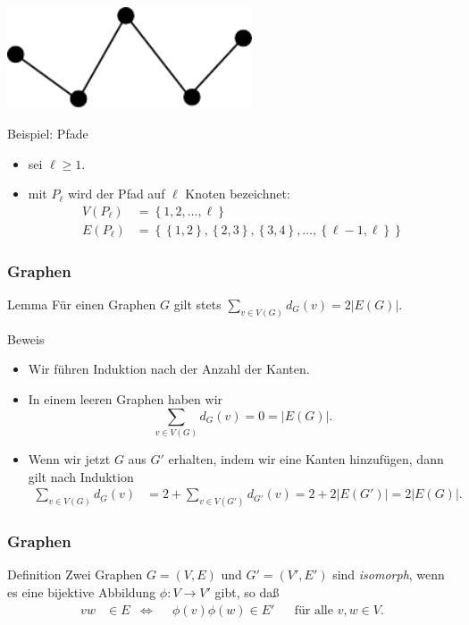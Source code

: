 \documentclass[aspectratio=1610, 11pt]{beamer}
\newcommand\cbc[1]{\left\{{#1}\right\}}
\newcommand{\mytitle}{Graphen}
\begin{document}
\begin{frame}
\begin{overprint}
	\hfill\includegraphics[height=30mm]{images/p5.pdf}
	\begin{exampleblock}{Beispiel: Pfade}
		\begin{itemize}
			\item sei $\ell\geq1$.
			\item mit $P_\ell$ wird der \alert{Pfad} auf $\ell$ Knoten bezeichnet:
				\begin{align*}
					V(P_\ell)&=\cbc{1,2,\ldots,\ell}\\
					E(P_\ell)&=\cbc{\cbc{1,2},\cbc{2,3},\cbc{3,4},\ldots,\cbc{\ell-1,\ell}}
				\end{align*}
		\end{itemize}
	\end{exampleblock}
	\end{overprint}
\end{frame}
 
\begin{frame}\frametitle{\mytitle}
	\begin{overprint}
\begin{block}{Lemma}
		F\"ur einen Graphen $G$ gilt stets $\displaystyle\sum_{v\in V(G)}d_G(v)=2|E(G)|.$
	\end{block}
\begin{exampleblock}{Beweis}
	\begin{itemize}
		\item Wir f\"uhren Induktion nach der Anzahl der Kanten.
		\item In einem leeren Graphen haben wir
			$$\sum_{v\in V(G)}d_G(v)=0=|E(G)|.$$
		\item Wenn wir jetzt $G$ aus $G'$ erhalten, indem wir eine Kanten hinzuf\"ugen, dann gilt nach Induktion
			\begin{align*}
				\sum_{v\in V(G)}d_G(v)&=2+\sum_{v\in V(G')}d_{G'}(v)=2+2|E(G')|=2|E(G)|.
			\end{align*}
	\end{itemize}
	\end{exampleblock}
	\end{overprint}
\end{frame}

\begin{frame}\frametitle{\mytitle}
	\begin{overprint}
		\onslide<1>
	\begin{block}{Definition}
		Zwei Graphen $G=(V,E)$ und $G'=(V',E')$ sind \emph{isomorph}, wenn es eine bijektive Abbildung $\phi:V\to V'$ gibt, so da\ss
		\begin{align*}
			vw&\in E&\Leftrightarrow&&\phi(v)\phi(w)\in E'&&\mbox{f\"ur alle }v,w\in V.
		\end{align*}
	\end{block}
	\end{overprint}
\end{frame}
\end{document}

